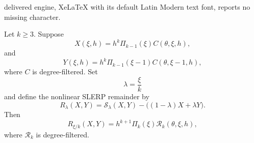 \documentclass[10pt,a4paper]{amsart}
\begin{document}
delivered engine, XeLaTeX with its default Latin Modern text font, reports no missing character.
\begin{lemma}
\label{lem:filtered_bch_closure}
Let \(k\geq3\).  Suppose
\[
        X(\xi,h)
        =
        h^k\Pi_{k-1}(\xi)C(\theta,\xi,h),
\]
and
\[
        Y(\xi,h)
        =
        h^k\Pi_{k-1}(\xi-1)C(\theta,\xi-1,h),
\]
where \(C\) is degree-filtered.  Set
\[
        \lambda=\frac{\xi}{k}
\]
and define the nonlinear SLERP remainder by
\[
        R_\lambda(X,Y)
        =
        \mathcal S_\lambda(X,Y)
        -
        \bigl((1-\lambda)X+\lambda Y\bigr).
\]
Then
\[
        R_{\xi/k}(X,Y)
        =
        h^{k+1}\Pi_k(\xi)\mathcal R_k(\theta,\xi,h),
\]
where \(\mathcal R_k\) is degree-filtered.
\end{lemma}
\end{document}
